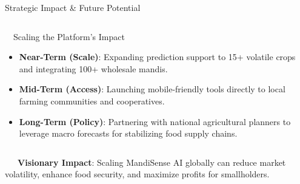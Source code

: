 \documentclass{beamer}
\begin{document}
\begin{frame}{Strategic Impact \& Future Potential}
\begin{columns}[T]
    \begin{column}{0.48\textwidth}
        \begin{successcard}[height=5.2cm]{~~Scaling the Platform's Impact}
            \fontsize{6.8pt}{8.2pt}\selectfont
            \begin{itemize}\setlength\itemsep{4.5pt}\setlength\parskip{0pt}
                \item \textbf{Near-Term (Scale)}: Expanding prediction support to 15+ volatile crops and integrating 100+ wholesale mandis.
                \item \textbf{Mid-Term (Access)}: Launching mobile-friendly tools directly to local farming communities and cooperatives.
                \item \textbf{Long-Term (Policy)}: Partnering with national agricultural planners to leverage macro forecasts for stabilizing food supply chains.
            \end{itemize}
        \end{successcard}
    \end{column}
\end{columns}

\vspace{0.15cm}
\begin{tcolorbox}[enhanced, colback=primaryblue!4, colframe=primaryblue!30, boxrule=0.35pt,
  arc=3.5pt, width=0.98\textwidth, left=4pt, right=4pt, top=2.5pt, bottom=2.5pt, boxsep=0pt,
  halign=center, shadow={0.5pt}{-0.5pt}{0pt}{black!8}]
    \fontsize{5.5pt}{6.5pt}\selectfont
    \textcolor{primaryDark}{~~~\textbf{Visionary Impact}: Scaling MandiSense AI globally can reduce market volatility, enhance food security, and maximize profits for smallholders.}
\end{tcolorbox}
\end{frame}

\end{document}
